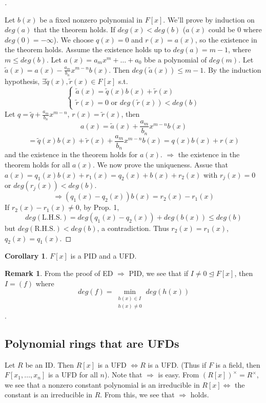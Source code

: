 \documentclass{article}
\theoremstyle{definition}
\newtheorem{rem}{Remark}
\newtheorem{cor}{Corollary}
\newenvironment{proofs}[1][\proofname]{%
  \begin{proof}[#1]$ $\par\nobreak\ignorespaces
}{%
  \end{proof}
}
\begin{document}
  
  \begin{proofs}
	Let $b(x)$ be a fixed nonzero polynomial in $F[x]$. We'll prove by induction on $deg(a)$ that the theorem holds. If $deg(x) < deg(b)$ ($a(x)$ could be 0 where $deg(0) = - \infty$). We choose $q(x) = 0$ and $r(x) = a(x)$, so the existence in the theorem holds. Assume the existence holds up to $deg(a) = m - 1$, where $m \leq deg(b)$. Let $a(x) = a_m x^m + \hdots + a_0$ bbe a polynomial of $deg(m)$. Let $\tilde{a}(x) = a(x) - \frac{a_m}{b_n} x^{m - n} b(x)$. Then $deg(\tilde{a}(x)) \leq m - 1$. By the induction hypothesis, $\exists \tilde{q}(x), \tilde{r}(x) \in F[x]$ s.t. 
	$$
	\left\{
	\begin{array}{c}
	  \tilde{a}(x) = \tilde{q}(x) b(x) + \tilde{r}(x)\\
	  \tilde{r}(x) = 0 \text{ or }  deg(\tilde{r}(x)) < deg(b)
	\end{array}
	\right.
	$$
	Let $q = \tilde{q} + \frac{a_m}{b_n} x^{m - n}$, $r(x) = \tilde{r}(x)$, then
	$$a(x) = \tilde{a}(x) + \frac{a_m}{b_n} x^{m - n} b(x) $$
	$$ = \tilde{q}(x) b(x) + \tilde{r}(x) + \frac{a_m}{b_n} x^{m - n} b(x) = q(x) b(x) + r(x)$$
	and the existence in the theorem holds for $a(x)$. $\Rightarrow$ the existence in the theorem holds for all $a(x)$. We now prove the uniqueness. Assue that $a(x) = q_1(x) b(x) + r_1(x) = q_2(x) + b(x) + r_2(x)$ with $r_j(x) = 0$ or $deg(r_j(x)) < deg(b)$.
	$$\Rightarrow (q_1(x) - q_2(x)) b(x) = r_2(x) - r_1(x)$$ 
	If $r_2(x) - r_1(x) \neq 0$, by Prop. 1, 
	$$deg(\text{L.H.S.})  = deg(q_1(x) - q_2(x)) + deg(b(x)) \leq deg(b)$$
	but $deg(\text{R.H.S.}) < deg(b)$, a contradiction. Thus $r_2(x) = r_1(x)$, $q_2(x) = q_1(x)$. 
  \end{proofs}
  
  \begin{cor}
	$F[x]$ is a PID and a UFD.
  \end{cor}
  
  \begin{rem}
	From the proof of ED $\Rightarrow$ PID, we see that if $I \neq 0 \trianglelefteq F[x]$, then $I = (f)$ where 
	$$deg(f) = \min_{\substack{h(x) \in I\\h(x) \neq 0}}	 deg(h(x))$$. 
  \end{rem}
  
  
  \subsection{Polynomial rings that are UFDs}
  
  Let $R$ be an ID. Then $R[x]$ is a UFD $\Leftrightarrow R$ is a UFD. (Thus if $F$ is a field, then $F[x_1, \hdots, x_n]$ is a UFD for all $n$). Note that $\Rightarrow $ is easy. From $(R[x])^\times = R^\times$, we see that a nonzero constant polynomial is an irreducible in $R[x] \Leftrightarrow$ the constant is an irreducible in $R$. From this, we see that $\Rightarrow$ holds. 
  
\end{document}
